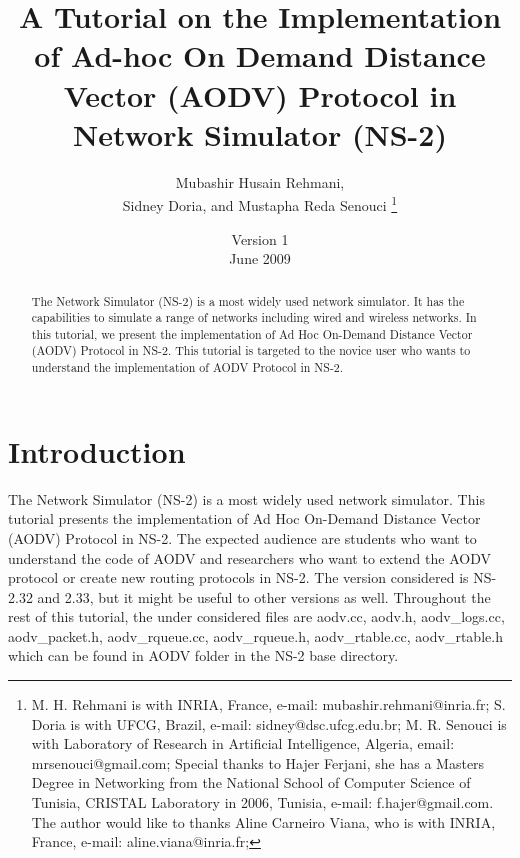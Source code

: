 \documentclass[times,10pt,onecolumn]{article}
\begin{document}
\title{A Tutorial on the Implementation of Ad-hoc On Demand Distance Vector (AODV) Protocol in Network Simulator (NS-2)\vspace{50pt}}

\author{Mubashir Husain Rehmani, \\ Sidney Doria, and Mustapha Reda Senouci \vspace{170pt} \thanks{M. H. Rehmani is with INRIA, France, e-mail: mubashir.rehmani@inria.fr; S. Doria is with UFCG, Brazil, e-mail: sidney@dsc.ufcg.edu.br; M. R. Senouci is with Laboratory of Research in Artificial Intelligence, Algeria, email: mrsenouci@gmail.com; Special thanks to Hajer Ferjani, she has a Masters Degree in Networking from the National School of Computer Science of Tunisia, CRISTAL Laboratory in 2006, Tunisia, e-mail: 
f.hajer@gmail.com. The author would like to thanks Aline Carneiro Viana, who is with INRIA, France, e-mail: aline.viana@inria.fr;} }

\date{Version 1 \vspace{55pt} \\  June 2009}

\maketitle
\pagebreak
\thispagestyle{plain}

\tableofcontents
\pagebreak

\begin{abstract}
The Network Simulator (NS-2) is a most widely used network simulator. It has the capabilities to simulate a range of networks including wired and wireless networks. In this tutorial, we present the implementation of Ad Hoc On-Demand Distance Vector (AODV) Protocol in NS-2. This tutorial is targeted to the novice user who wants to understand the implementation of AODV Protocol in NS-2.
\end{abstract}



\section{Introduction}
\label{sec:introduction}

The Network Simulator (NS-2) \cite{IEEEhowto:ns} is a most widely used network simulator. This tutorial presents the implementation of Ad Hoc On-Demand Distance Vector (AODV) Protocol \cite{IEEEhowto:aodv} in NS-2. The expected audience are students who want to understand the code of AODV and researchers who want to extend the AODV protocol or create new routing protocols in NS-2. The version considered is NS-2.32 and 2.33, but it might be useful to other versions as well. Throughout the rest of this tutorial, the under considered files are aodv.cc, aodv.h, aodv\_logs.cc, aodv\_packet.h, aodv\_rqueue.cc, aodv\_rqueue.h, aodv\_rtable.cc, aodv\_rtable.h which can be found in AODV folder in the NS-2 base directory.
\end{document}
